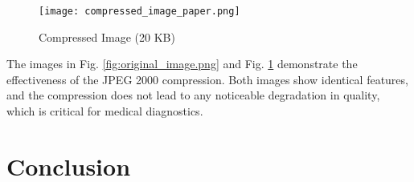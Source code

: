 \documentclass[conference,letterpaper]{IEEEtran}
\begin{document}
\begin{figure}[H]
    \centering
    \texttt{[image: compressed\_image\_paper.png]}
    \caption{Compressed Image (20 KB)}
    \label{fig:compressed_image_paper.png}
\end{figure}

The images in Fig. \ref{fig:original_image.png} and Fig. \ref{fig:compressed_image_paper.png} demonstrate the effectiveness of the JPEG 2000 compression. Both images show identical features, and the compression does not lead to any noticeable degradation in quality, which is critical for medical diagnostics.


\section{Conclusion}
\end{document}
